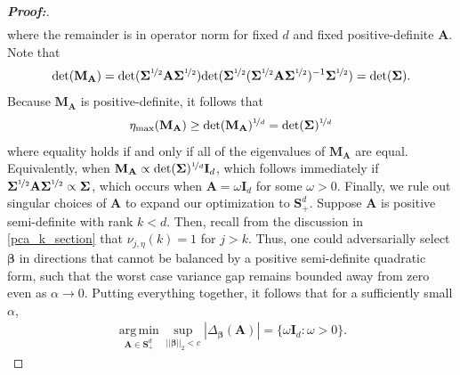 \documentclass[11pt,twoside]{article}
\theoremstyle{definition}
\theoremstyle{remark}
\begin{document}
\begin{proof}[\textbf{Proof:}]
\begin{align*}
\end{align*}
where the remainder is in operator norm for fixed $d$ and fixed
positive-definite $\mathbf{A}$. Note that
\begin{align*}
     \text{det}(\mathbf{M}_{\mathbf{A}}) = \text{det}(\mathbf{\Sigma}^{\nicefrac{1}{2}} \mathbf{A} \mathbf{\Sigma}^{\nicefrac{1}{2}}) \text{det}(\mathbf{\Sigma}^{\nicefrac{1}{2}} (\mathbf{\Sigma}^{\nicefrac{1}{2}} \mathbf{A} \mathbf{\Sigma}^{\nicefrac{1}{2}})^{-1} \mathbf{\Sigma}^{\nicefrac{1}{2}}) = \text{det}(\mathbf{\Sigma}).
\end{align*}
Because $\mathbf{M}_{\mathbf{A}}$ is positive-definite, it follows that
\begin{align*}
    \eta_{\max}(\mathbf{M}_{\mathbf{A}}) \geq \text{det}(\mathbf{M}_{\mathbf{A}})^{\nicefrac{1}{d}} =
    \text{det}(\mathbf{\Sigma})^{\nicefrac{1}{d}}
\end{align*}
where equality holds if and only if all of the eigenvalues of $\mathbf{M}_{\mathbf{A}}$ are equal. Equivalently, when $\mathbf{M}_{\mathbf{A}} \propto \text{det}(\mathbf{\Sigma})^{\nicefrac{1}{d}} \mathbf{I}_d$, which follows immediately if $\mathbf{\Sigma}^{\nicefrac{1}{2}} \mathbf{A} \mathbf{\Sigma}^{\nicefrac{1}{2}} \propto \mathbf{\Sigma}$, which occurs when $\mathbf{A} = \omega \mathbf{I}_d$ for some $\omega > 0$. Finally, we rule out singular choices of $\mathbf{A}$ to expand our optimization to $\mathbf{S}^d_{+}$. Suppose $\mathbf{A}$ is positive semi-definite with rank $k < d$. Then, recall from the discussion in \cref{pca_k_section} that $\nu_{j, \eta}(k) = 1$ for $j > k$. Thus, one could adversarially select $\bm{\beta}$ in directions that cannot be balanced by a positive semi-definite quadratic form, such that the worst case variance gap remains bounded away from zero even as $\alpha \to 0$. Putting everything together, it follows that for a sufficiently small $\alpha$,
\begin{align*}
            \operatorname*{arg\,min}_{\mathbf{A}\in\mathbf{S}^d_{+}}
        \sup_{||\bm{\beta}||_2<c} \left| \Delta_{\bm{\beta}}(\mathbf{A}) \right| = \{\omega\mathbf{I}_d:\omega>0\}.
\end{align*}
\end{proof}
\end{document}
